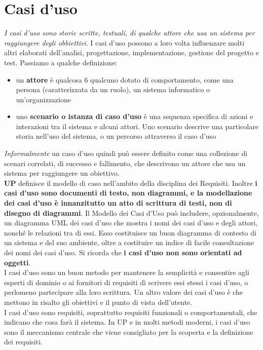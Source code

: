 \documentclass[a4paper,12pt, oneside]{book}
\begin{document}
\chapter{Casi d'uso}
\textit{I casi d'uso sono storie scritte, testuali, di qualche attore che usa un sistema per raggiungere degli obbiettivi}. I casi d'uso possono a loro volta influenzare molti altri elaborati dell'analisi, progettazione, implementazione, gestione del progetto e test. Passiamo a qualche definizione:
\begin{itemize}
	\item un \textbf{attore} è qualcosa 6 qualcuno dotato di
		comportamento, come una persona (caratterizzata da un ruolo), un sistema informatico o un'organizzazione
	\item uno \textbf{scenario o istanza di caso d'uso} è una sequenza specifica di azioni e interazioni
		  tra il sistema e alcuni attori. Uno scenario descrive una particolare storia nell'uso del sistema, o un percorso attraverso il caso d'uso
\end{itemize}
\textit{Informalmente }un caso d'uso quindi può essere definito come una collezione di scenari correlati, di successo e fallimento, che descrivono un attore che usa un sistema per raggiungere un obiettivo.\\
\textbf{UP} definisce il modello di caso nell'ambito della disciplina dei Requisiti. Inoltre \textbf{i casi d'uso sono documenti di testo, non diagrammi, e la modellazione dei casi
d'uso è innanzitutto un atto di scrittura di testi, non di disegno di diagrammi}. Il Modello dei Casi d'Uso può includere, opzionalmente, un diagramma UML dei casi
d'uso che mostra i nomi dei casi d'uso e degli attori, nonché le relazioni tra di essi. Esso costituisce un buon diagramma di contesto di un sistema e del suo ambiente, oltre a
costituire un indice di facile consultazione dei nomi dei casi d'uso. Si ricorda che \textbf{i casi d'uso non sono orientati ad oggetti}.\\
I casi d'uso sono un buon metodo per mantenere la semplicità e consentire agli esperti
di dominio o ai fornitori di requisiti di scrivere essi stessi i casi d'uso, o perlomeno partecipare alla loro scrittura. Un altro valore dei casi d'uso è che mettono in risalto gli obiettivi e il punto di vista
dell'utente.\\
I casi d'uso sono requisiti, soprattutto requisiti funzionali o comportamentali, che indicano che cosa farà il sistema. In UP e in molti metodi moderni, i casi d'uso sono il meccanismo
centrale che viene consigliato per la scoperta e la definizione dei requisiti.\\
\end{document}
